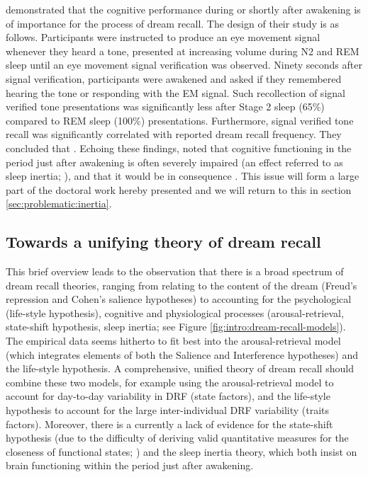 \citet{conduit_poor_2004} demonstrated that the cognitive performance during or shortly after awakening is of importance for the process of dream recall. The design of their study is as follows. Participants were instructed to produce an eye movement signal whenever they heard a tone, presented at increasing volume during N2 and REM sleep until an eye movement signal verification was observed.  Ninety seconds after signal verification, participants were awakened and asked if they remembered hearing the tone or responding with the EM signal. Such recollection of signal verified tone presentations was significantly less after Stage 2 sleep (65\%) compared to REM sleep (100\%) presentations. Furthermore, signal verified tone recall was significantly correlated with reported dream recall frequency. They concluded that  \citep{conduit_poor_2004}.
Echoing these findings, \citet{schredl_factors_2003} noted that cognitive functioning in the period just after awakening is often severely impaired (an effect referred to as sleep inertia; \citealp{tassi_sleep_2000, trotti_waking_2016}), and that it would be in consequence . This issue will form a large part of the doctoral work hereby presented and we will return to this in section \ref{sec:problematic:inertia}.

\subsection{Towards a unifying theory of dream recall}
\label{sec:dream-recall:theories:unifying}

This brief overview leads to the observation that there is a broad spectrum of dream recall theories, ranging from relating to the content of the dream (Freud’s repression and Cohen’s salience hypotheses) to accounting for the psychological (life-style hypothesis), cognitive and physiological processes (arousal-retrieval,  state-shift hypothesis, sleep inertia; see Figure \ref{fig:intro:dream-recall-models}). The empirical data seems hitherto to fit best into the arousal-retrieval model (which integrates elements of both the Salience and Interference hypotheses) and the life-style hypothesis. A comprehensive, unified theory of dream recall should combine these two models, for example using the arousal-retrieval model to account for day-to-day variability in DRF (state factors), and the life-style hypothesis to account for the large inter-individual DRF variability (traits factors). Moreover, there is a currently a lack of evidence for the state-shift hypothesis (due to the difficulty of deriving valid quantitative measures for the closeness of functional states; \citealp{schredl_dream_1999}) and the sleep inertia theory, which both insist on brain functioning within the period just after awakening.

